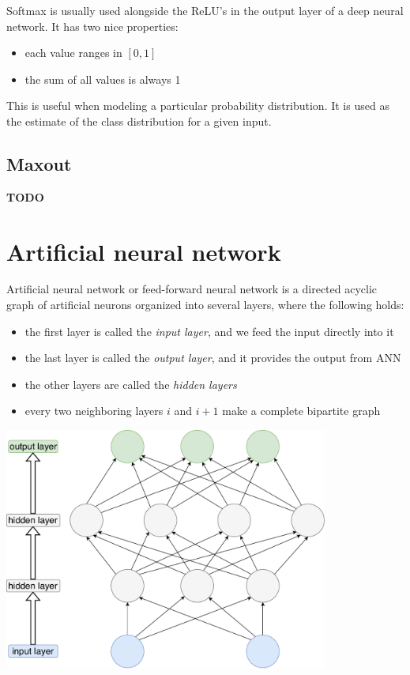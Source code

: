\noindent
Softmax is usually used alongside the ReLU's in the output layer of a deep neural network. It has two nice properties:

\begin{itemize}

\item each value ranges in $[0, 1]$
\item the sum of all values is always 1

\end{itemize}

This is useful when modeling a particular probability distribution. It is used as the estimate of the class distribution for a given input.

\subsection*{Maxout}

\textbf{TODO}

\section{Artificial neural network}

Artificial neural network or feed-forward neural network is a directed acyclic graph of artificial neurons organized into several layers, where the following holds:

\begin{itemize}

\item the first layer is called the \textit{input layer}, and we feed the input directly into it
\item the last layer is called the \textit{output layer}, and it provides the output from ANN
\item the other layers are called the \textit{hidden layers}
\item every two neighboring layers $i$ and $i+1$ make a complete bipartite graph

\end{itemize}

\includegraphics[width=0.8\textwidth]{tex/images/ann}

